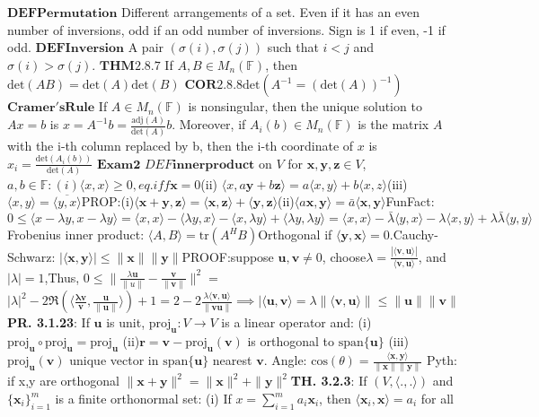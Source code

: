 \documentclass{article}
\theoremstyle{definition}
\begin{document}
{$\mathbf{DEF Permutation}$ Different arrangements of a set. Even if it has an even number of inversions, odd if an odd number of inversions. Sign is 1 if even, -1 if odd.
$\mathbf{DEF Inversion}$ A pair $(\sigma(i), \sigma(j))$ such that $i<j$ and $\sigma(i) > \sigma(j)$.
$\mathbf{THM2.8.7}$ If $A, B \in M_n(\mathbb{F})$, then $\text{det}(AB) = \text{det}(A)\text{det}(B)$
$\mathbf{COR2.8.8} \text{det}(A^{-1} = (\text{det}(A))^{-1})$
$\mathbf{Cramer's Rule}$ If $A \in M_n(\mathbb{F})$ is nonsingular, then the unique solution to $Ax=b$ is $x = A^{-1}b = \frac{\text{adj}(A)}{\text{det}(A)}b$. Moreover, if $A_i(b) \in M_n(\mathbb{F})$ is the matrix $A$ with the i-th column replaced by b, then the i-th coordinate of $x$ is $x_i = \frac{\text{det}(A_i(b))}{\text{det}(A)}$
$\mathbf{Exam 2}$ $DEF \mathbf{innerproduct}$ on $V$ for $\mathbf{x,y,z} \in V$, $a,b \in \mathbb{F}: (i) \langle x,x \rangle \geq 0, eq. iff \mathbf{x} =0 $(ii) $\langle x,a \mathbf{y} + b \mathbf{z}  \rangle = a \langle x,y \rangle + b \langle x,z \rangle$(iii)$ \langle x,y \rangle = \overline { \langle y,x \rangle }$PROP:(i)$\langle \mathbf{x + y}, \mathbf{z} \rangle = \langle \mathbf{x}, \mathbf{z} \rangle + \langle \mathbf{y}, \mathbf{z} \rangle $(ii)$ \langle a\mathbf{x}, \mathbf{y} \rangle = \bar a \langle \mathbf{x}, \mathbf{y} \rangle $FunFact: $0 \leq \langle x - \lambda y, x - \lambda y \rangle = \langle x,x\rangle - \langle \lambda y, x \rangle - \langle x, \lambda y \rangle + \langle \lambda y, \lambda y \rangle = \langle x,x \rangle - \bar \lambda \langle y,x\rangle - \lambda \langle x,y\rangle + \lambda \bar \lambda \langle y,y\rangle$Frobenius inner product: $\langle A, B \rangle = \text{tr}(A^HB)$Orthogonal if $\langle \mathbf{y}, \mathbf{x} \rangle = 0$.Cauchy-Schwarz: $|\langle \mathbf{x}, \mathbf{y} \rangle | \leq \|\mathbf{x}\| \|\mathbf{y}\|$PROOF:suppose $\mathbf{u}, \mathbf{v} \neq 0$, choose$\lambda = \frac{|\langle \mathbf{v}, \mathbf{u} \rangle |}{\langle \mathbf{v}, \mathbf{u} \rangle }$, and $|\lambda| = 1$,Thus, $0 \leq \| \frac{\lambda \mathbf{u}}{\|u\|} - \frac{\mathbf{v}}{\|\mathbf{v}\|}\|^2 = $$|\lambda|^2 -2 \Re(\langle \mathbf{\frac{\lambda \mathbf{v}}{\mathbf{v}}},\frac{\mathbf{u}}{\|\mathbf{u}\|} \rangle ) + 1 = 2 - 2 \frac{\lambda \langle \mathbf{v}, \mathbf{u} \rangle }{\|\mathbf{v}\mathbf{u}\|} \implies |\langle \mathbf{u}, \mathbf{v} \rangle = \lambda \| \langle \mathbf{v}, \mathbf{u} \rangle \| \leq \|\mathbf{u}\| \| \mathbf{v}\|$ \textbf{PR. 3.1.23}: If $\textbf{u}$ is unit, $\text{proj}_{\textbf{u}}: V\rightarrow V$ is a linear operator and: (i) $\text{proj}_{\textbf{u}} \circ \text{proj}_{\textbf{u}} =\text{proj}_{\textbf{u}} $ (ii)$\textbf{r}=\textbf{v}-\text{proj}_{\textbf{u}}(\textbf{v})$ is orthogonal to $\text{span}\{\textbf{u}\}$ (iii) $\text{proj}_{\textbf{u}}(\textbf{v})$ unique vector in $\text{span}\{\textbf{u}\}$ nearest $\textbf{v}$. Angle: $ \text{cos}(\theta) = \frac{\langle \mathbf{x}, \mathbf{y} \rangle }{\| \mathbf{x}\| \|\mathbf{y}\|}$ Pyth: if x,y are orthogonal $\|\mathbf{x}+ \mathbf{y}\|^2 = \|\mathbf{x}\|^2 + \|\mathbf{y}\|^2$\textbf{TH. 3.2.3}: If $(V, \langle .,. \rangle)$ and $\{ \textbf{x}_i \}_{i=1}^m$ is a finite orthonormal set: (i) If $x = \sum_{i=1}^m a_i\textbf{x}_i$, then $\langle \textbf{x}_i, \textbf{x} \rangle = a_i$ for all }
\end{document}
